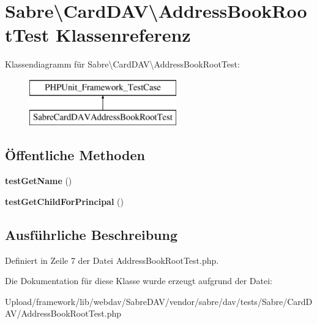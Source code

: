 \hypertarget{class_sabre_1_1_card_d_a_v_1_1_address_book_root_test}{}\section{Sabre\textbackslash{}Card\+D\+AV\textbackslash{}Address\+Book\+Root\+Test Klassenreferenz}
\label{class_sabre_1_1_card_d_a_v_1_1_address_book_root_test}
Klassendiagramm für Sabre\textbackslash{}Card\+D\+AV\textbackslash{}Address\+Book\+Root\+Test\+:\begin{figure}[H]
\begin{center}
\leavevmode
\includegraphics[height=2.000000cm]{class_sabre_1_1_card_d_a_v_1_1_address_book_root_test}
\end{center}
\end{figure}
\subsection*{Öffentliche Methoden}
\begin{DoxyCompactItemize}
\item 
\mbox{\label{class_sabre_1_1_card_d_a_v_1_1_address_book_root_test_addd99236506631b9085924f6ddd88ea8}} 
{\bfseries test\+Get\+Name} ()
\item 
\mbox{\label{class_sabre_1_1_card_d_a_v_1_1_address_book_root_test_ac23bbaaa4b6cfb86a961e0182a4498f6}} 
{\bfseries test\+Get\+Child\+For\+Principal} ()
\end{DoxyCompactItemize}


\subsection{Ausführliche Beschreibung}


Definiert in Zeile 7 der Datei Address\+Book\+Root\+Test.\+php.



Die Dokumentation für diese Klasse wurde erzeugt aufgrund der Datei\+:\begin{DoxyCompactItemize}
\item 
Upload/framework/lib/webdav/\+Sabre\+D\+A\+V/vendor/sabre/dav/tests/\+Sabre/\+Card\+D\+A\+V/Address\+Book\+Root\+Test.\+php\end{DoxyCompactItemize}

